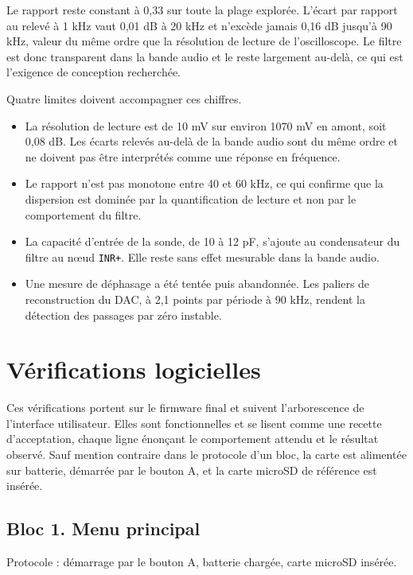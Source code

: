 Le rapport reste constant à 0,33 sur toute la plage explorée. L'écart par rapport au relevé à 1 kHz vaut 0,01 dB à 20 kHz et n'excède jamais 0,16 dB jusqu'à 90 kHz, valeur du même ordre que la résolution de lecture de l'oscilloscope. Le filtre est donc transparent dans la bande audio et le reste largement au-delà, ce qui est l'exigence de conception recherchée.

Quatre limites doivent accompagner ces chiffres.

\begin{itemize}
  \item La résolution de lecture est de 10 mV sur environ 1070 mV en amont, soit 0,08 dB. Les écarts relevés au-delà de la bande audio sont du même ordre et ne doivent pas être interprétés comme une réponse en fréquence.
  \item Le rapport n'est pas monotone entre 40 et 60 kHz, ce qui confirme que la dispersion est dominée par la quantification de lecture et non par le comportement du filtre.
  \item La capacité d'entrée de la sonde, de 10 à 12 pF, s'ajoute au condensateur du filtre au nœud \texttt{INR+}. Elle reste sans effet mesurable dans la bande audio.
  \item Une mesure de déphasage a été tentée puis abandonnée. Les paliers de reconstruction du \gls{DAC}, à 2,1 points par période à 90 kHz, rendent la détection des passages par zéro instable.
\end{itemize}

\section{Vérifications logicielles}
\label{ann:mesures_sw}

Ces vérifications portent sur le firmware final et suivent l'arborescence de l'interface utilisateur. Elles sont fonctionnelles et se lisent comme une recette d'acceptation, chaque ligne énonçant le comportement attendu et le résultat observé. Sauf mention contraire dans le protocole d'un bloc, la carte est alimentée sur batterie, démarrée par le bouton A, et la carte microSD de référence est insérée.

\subsection{Bloc 1. Menu principal}

Protocole : démarrage par le bouton A, batterie chargée, carte microSD insérée.

